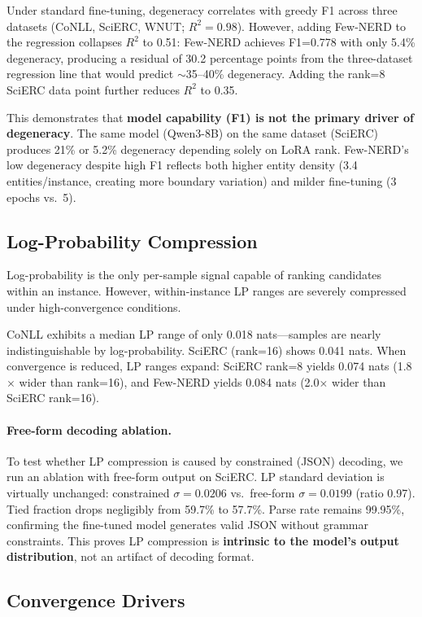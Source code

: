 \documentclass[11pt,a4paper]{article}
\begin{document}
Under standard fine-tuning, degeneracy correlates with greedy F1 across three datasets (CoNLL, SciERC, WNUT; $R^2{=}0.98$).
However, adding Few-NERD to the regression collapses $R^2$ to 0.51: Few-NERD achieves F1=0.778 with only 5.4\% degeneracy, producing a residual of 30.2 percentage points from the three-dataset regression line that would predict $\sim$35--40\% degeneracy.
Adding the rank=8 SciERC data point further reduces $R^2$ to 0.35.

This demonstrates that \textbf{model capability (F1) is not the primary driver of degeneracy}.
The same model (Qwen3-8B) on the same dataset (SciERC) produces 21\% or 5.2\% degeneracy depending solely on LoRA rank.
Few-NERD's low degeneracy despite high F1 reflects both higher entity density (3.4 entities/instance, creating more boundary variation) and milder fine-tuning (3 epochs vs.\ 5).

\subsection{Log-Probability Compression}

Log-probability is the only per-sample signal capable of ranking candidates within an instance.
However, within-instance LP ranges are severely compressed under high-convergence conditions.

CoNLL exhibits a median LP range of only 0.018 nats---samples are nearly indistinguishable by log-probability.
SciERC (rank=16) shows 0.041 nats.
When convergence is reduced, LP ranges expand: SciERC rank=8 yields 0.074 nats (1.8$\times$ wider than rank=16), and Few-NERD yields 0.084 nats (2.0$\times$ wider than SciERC rank=16).

\paragraph{Free-form decoding ablation.}
To test whether LP compression is caused by constrained (JSON) decoding, we run an ablation with free-form output on SciERC.
LP standard deviation is virtually unchanged: constrained $\sigma{=}0.0206$ vs.\ free-form $\sigma{=}0.0199$ (ratio 0.97).
Tied fraction drops negligibly from 59.7\% to 57.7\%.
Parse rate remains 99.95\%, confirming the fine-tuned model generates valid JSON without grammar constraints.
This proves LP compression is \textbf{intrinsic to the model's output distribution}, not an artifact of decoding format.

\subsection{Convergence Drivers}
\label{sec:drivers}
\end{document}
